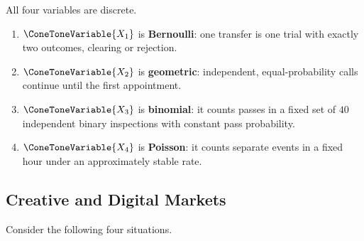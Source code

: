 	All four variables are discrete.
	\begin{enumerate}
		\item $\ConeToneVariable{X_1}$ is \textbf{Bernoulli}: one transfer is one trial with exactly two outcomes, clearing or rejection.
		\item $\ConeToneVariable{X_2}$ is \textbf{geometric}: independent, equal-probability calls continue until the first appointment.
		\item $\ConeToneVariable{X_3}$ is \textbf{binomial}: it counts passes in a fixed set of $40$ independent binary inspections with constant pass probability.
		\item $\ConeToneVariable{X_4}$ is \textbf{Poisson}: it counts separate events in a fixed hour under an approximately stable rate.
	\end{enumerate}


	\subsection{Creative and Digital Markets}
	\label{sec:creative-digital-markets}

	Consider the following four situations.

